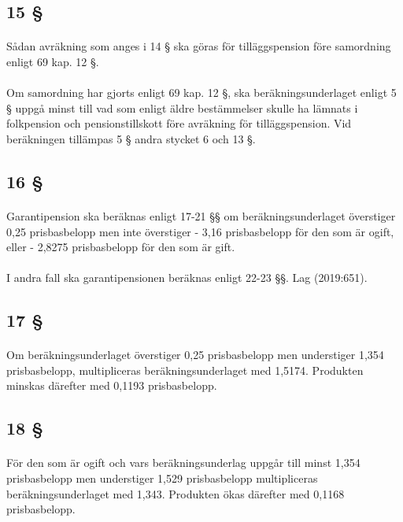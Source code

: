 \documentclass[a4paper,notitlepage,openany,10pt]{book}
\begin{document}
\subsection*{15 §}
\paragraph*{}
Sådan avräkning som anges i 14 § ska göras för tilläggspension före samordning enligt 69 kap. 12 §.
\paragraph*{}
Om samordning har gjorts enligt 69 kap. 12 §, ska beräkningsunderlaget enligt 5 § uppgå minst till vad som enligt äldre bestämmelser skulle ha lämnats i folkpension och pensionstillskott före avräkning för tilläggspension. Vid beräkningen tillämpas 5 § andra stycket 6 och 13 §.
\subsection*{16 §}
\paragraph*{}
Garantipension ska beräknas enligt 17-21 §§ om beräkningsunderlaget överstiger 0,25 prisbasbelopp men inte överstiger
\newline - 3,16 prisbasbelopp för den som är ogift, eller
\newline - 2,8275 prisbasbelopp för den som är gift.
\paragraph*{}
I andra fall ska garantipensionen beräknas enligt 22-23 §§.
Lag (2019:651).
\subsection*{17 §}
\paragraph*{}
Om beräkningsunderlaget överstiger 0,25 prisbasbelopp men understiger 1,354 prisbasbelopp, multipliceras beräkningsunderlaget med 1,5174. Produkten minskas därefter med 0,1193 prisbasbelopp.
\subsection*{18 §}
\paragraph*{}
För den som är ogift och vars beräkningsunderlag uppgår till minst 1,354 prisbasbelopp men understiger 1,529 prisbasbelopp multipliceras beräkningsunderlaget med 1,343.
Produkten ökas därefter med 0,1168 prisbasbelopp.
\end{document}
